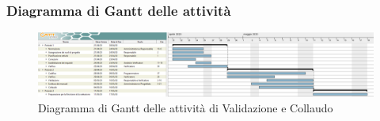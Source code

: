 \newpage
\begin{landscape}
	\subsubsection{Diagramma di Gantt delle attività}
	\pagestyle{empty}
	\begin{figure}[h]
		
		\begin{center}	
			\includegraphics[scale=1.6]{Sezioni/DiagrammiGantt/Validazione.png}
		\end{center}
	\caption{Diagramma di Gantt delle attività di Validazione e Collaudo}	
	\end{figure}
\end{landscape}
